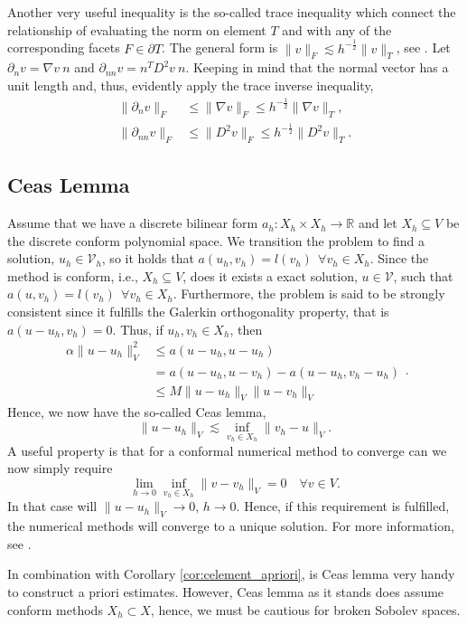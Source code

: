Another very useful inequality is the so-called trace inequality which connect the relationship of evaluating the norm on element $ T $ and with any of the corresponding facets $F \in \partial T$. The general form is $\| v \|_{F   }^{  }  \lesssim
h^{-\frac{1}{2}} \| v \|_{ T  }^{  } $, see \cite[Lemma 12.8]{ErnGuermond2021}. Let $\partial _{n} v = \nabla v \ n$ and $\partial_{nn} v = n^{T} D^2 v \ n $. Keeping in mind that the normal vector has a unit length and, thus, evidently apply the trace inverse inequality, \[
\begin{split}
    \| \partial _{n} v \|_{F  }^{  }  & \le \| \nabla v \|_{F  }^{  }  \le h^{-\frac{1}{2}} \| \nabla  v \|_{T  }^{  },  \\
    \| \partial _{nn} v \|_{ F }^{  } & \le  \| D^2 v \|_{ F }^{  }   \le  h^{-\frac{1}{2}} \| D^2 v \|_{ T }^{  }.
\end{split}
\]

\subsection{Ceas Lemma}%
\label{sub:ceas_lemma}

Assume that we have a discrete bilinear form $a_{h}: X_{h}\times X_{h} \to \mathbb{R} $ and let $X _{h} \subseteq  V $ be the discrete conform polynomial space. We transition the problem to find a solution, $u_{h} \in  \mathcal{V}_{h}$, so it holds that $a\left( u_{h},v_{h} \right)  = l\left( v_{h} \right) \ \  \forall v_{h} \in X _{h} $.
Since the method is conform, i.e., $X _{h} \subseteq  V $, does it exists a exact solution, $u \in  \mathcal{V}$, such that \(
a \left( u, v_{h} \right)  = l\left( v_{h} \right)  \ \  \forall v_{h} \in  X _{h}.
\)
Furthermore, the problem is said to be strongly consistent since it fulfills the Galerkin orthogonality property, that is $ a\left( u -u_{h} , v_{h} \right)  =0$. Thus, if $u_{h},v_{h} \in  X _{h}$, then
\begin{equation}
\label{eq:cealemma_proof}
    \begin{split}
\alpha \| u -u_{h} \|_{ V  }^{ 2 } & \le  a\left( u - u_{h}, u - u_{h}  \right)    \\
&= a\left( u - u_{h}, u -v_{h} \right) - a\left( u -u_{h}, v_{h} - u_{h} \right)  \\
 &  \le  M \| u - u_{h} \|_{ V  }^{  }  \| u - v_{h} \|_{ V  }^{  }
    \end{split}
.\end{equation}
Hence, we now have the so-called Ceas lemma, \[
\| u - u_{h} \|_{ V  }^{  }  \lesssim  \inf_{v_{h} \in X_{h} } \|  v_{h} - u \|_{V  }^{  }.
\]
A useful property is that for a conformal numerical method to converge can we now simply require \[
\lim_{h \to 0}  \inf_{v_{h} \in  X_{h}}  \| v - v_{h} \|_{ V  }^{  } = 0 \quad  \forall v \in V.
\]
In that case will $\| u - u_{h} \|_{ V  }^{  }  \to  0$, $h \to  0$. Hence, if this requirement is fulfilled, the numerical methods will converge to a unique solution.
For more information, see \cite[pp. 66]{quartdiff}.

In combination with Corollary \ref{cor:celement_apriori}, is Ceas lemma very handy to construct a priori estimates. However, Ceas lemma as it stands does assume conform methods $X_{h} \subset X$, hence, we must be cautious for broken Sobolev spaces.




